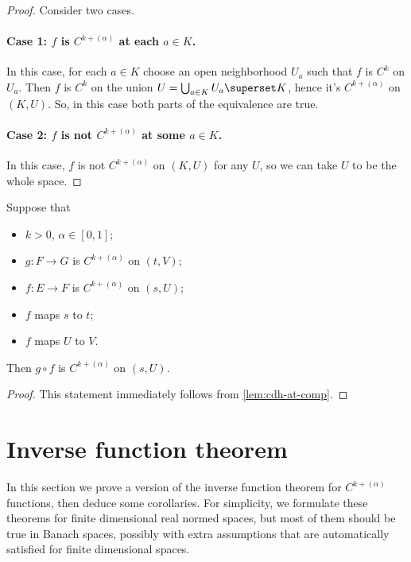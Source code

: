 \begin{proof}
  \leanok%
  Consider two cases.

  \paragraph{Case 1: \(f\) is \(C^{k+(\alpha)}\) at each \(a \in K\).}
  In this case, for each \(a \in K\) choose an open neighborhood \(U_{a}\) such that \(f\) is \(C^{k}\) on \(U_{a}\).
  Then \(f\) is \(C^{k}\) on the union \(U = \bigcup_{a\in K} U_{a} \superset K\), hence it's \(C^{k+(\alpha)}\) on \((K, U)\).
  So, in this case both parts of the equivalence are true.

  \paragraph{Case 2: \(f\) is not \(C^{k+(\alpha)}\) at some \(a \in K\).}
  In this case, \(f\) is not \(C^{k+(\alpha)}\) on \((K, U)\) for any \(U\), so we can take \(U\) to be the whole space.
\end{proof}

\begin{lemma}%
  \label{lem:cdh-on-comp}
  \leanok%
  Suppose that
  \begin{itemize}
  \item \(k > 0\), \(\alpha \in [0, 1]\);
  \item \(g\colon F\to G\) is \(C^{k+(\alpha)}\) on \((t, V)\);
  \item \(f\colon E\to F\) is \(C^{k+(\alpha)}\) on \((s, U)\);
  \item \(f\) maps \(s\) to \(t\);
  \item \(f\) maps \(U\) to \(V\).
  \end{itemize}
  Then \(g\circ f\) is \(C^{k+(\alpha)}\) on \((s, U)\).
\end{lemma}

\begin{proof}
  \leanok%
  This statement immediately follows from \autoref{lem:cdh-at-comp}.
\end{proof}

\section{Inverse function theorem}%
\label{sec:inverse-funct-theor}

In this section we prove a version of the inverse function theorem for \(C^{k+(\alpha)}\) functions,
then deduce some corollaries.
For simplicity, we formulate these theorems for finite dimensional real normed spaces,
but most of them should be true in Banach spaces,
possibly with extra assumptions that are automatically satisfied for finite dimensional spaces.

